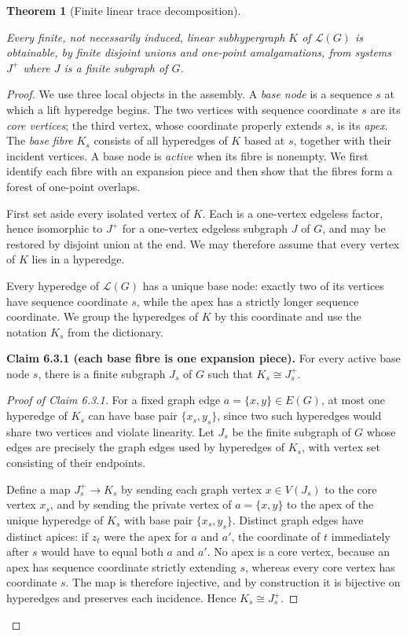 \documentclass[a4paper,11pt,reqno]{amsart}
\theoremstyle{plain}
\newtheorem{theorem}{Theorem}[section]
\theoremstyle{definition}
\theoremstyle{remark}
\begin{document}
\begin{theorem}[Finite linear trace decomposition]\label{theorem-6.3-exact-finite-linear-trace-theorem}

Every finite, not necessarily induced, linear subhypergraph \(K\) of
\(\mathcal L(G)\) is obtainable, by finite disjoint unions and one-point
amalgamations, from systems \(J^+\) where \(J\) is a finite subgraph of
\(G\).

\end{theorem}
\begin{proof}
We use three local objects in the assembly.  A \emph{base node} is a sequence
\(s\) at which a lift hyperedge begins.  The two vertices with sequence
coordinate \(s\) are its \emph{core vertices}; the third vertex, whose
coordinate properly extends \(s\), is its \emph{apex}.  The \emph{base fibre}
\(K_s\) consists of all hyperedges of \(K\) based at \(s\), together with
their incident vertices.  A base node is \emph{active} when its fibre is
nonempty.  We first identify each fibre with an expansion piece and then show
that the fibres form a forest of one-point overlaps.

First set aside every isolated vertex of \(K\). Each is a one-vertex edgeless
factor, hence isomorphic to \(J^+\) for a one-vertex edgeless subgraph \(J\)
of \(G\), and may be restored by disjoint union at the end. We may therefore
assume that every vertex of \(K\) lies in a hyperedge.

Every hyperedge of \(\mathcal L(G)\) has a unique base node: exactly two of
its vertices have sequence coordinate \(s\), while the apex has a strictly
longer sequence coordinate. We group the hyperedges of \(K\) by this
coordinate and use the notation \(K_s\) from the dictionary.

\medskip
\noindent\textbf{Claim 6.3.1 (each base fibre is one expansion piece).}
For every active base node \(s\), there is a finite subgraph \(J_s\) of
\(G\) such that \(K_s\cong J_s^+\).

\smallskip
\begin{proof}[Proof of Claim 6.3.1]

For a fixed graph edge \(a=\{x,y\}\in E(G)\), at most one hyperedge of \(K_s\) can have base pair \(\{x_s,y_s\}\), since two such hyperedges would share two vertices and violate linearity. Let \(J_s\) be the finite subgraph of \(G\) whose edges are precisely the graph edges used by hyperedges of \(K_s\), with vertex set consisting of their endpoints.

Define a map \(J_s^+\to K_s\) by sending each graph vertex \(x\in V(J_s)\)
to the core vertex \(x_s\), and by sending the private vertex of
\(a=\{x,y\}\) to the apex of the unique hyperedge of \(K_s\) with base pair
\(\{x_s,y_s\}\). Distinct graph edges have distinct apices: if \(z_t\)
were the apex for \(a\) and \(a'\), the coordinate of \(t\) immediately
after \(s\) would have to equal both \(a\) and \(a'\). No apex is a core
vertex, because an apex has sequence coordinate strictly extending \(s\),
whereas every core vertex has coordinate \(s\). The map is therefore
injective, and by construction it is bijective on hyperedges and preserves
each incidence. Hence \(K_s\cong J_s^+\).
\end{proof}


\end{proof}
\end{document}
